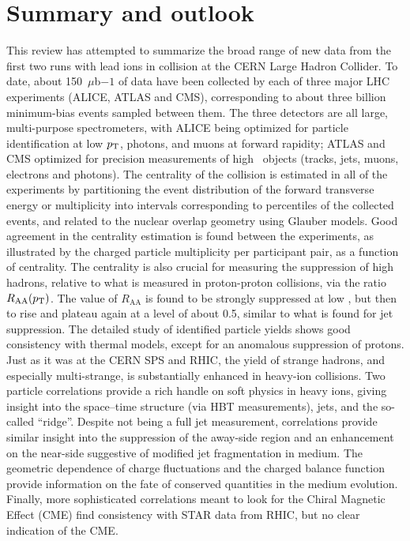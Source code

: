 \section{Summary and outlook}
\label{secall:summary}
This review has attempted to summarize the broad range of new data from the first two
runs with lead ions in collision at the CERN Large Hadron Collider.
To date, about 150~$\mu$b$-1$ of data have been collected by each of
three major LHC experiments (ALICE, ATLAS and CMS), corresponding to about three billion
minimum-bias events sampled between them.
The three detectors are all large, multi-purpose spectrometers, with ALICE being optimized
for particle identification at low $p_{\rm T}$, photons, and muons at forward rapidity;
ATLAS and CMS optimized for precision measurements
of high \pT\ objects (tracks, jets, muons, electrons and photons).
The centrality of the collision is estimated in all of the experiments by partitioning
the event distribution of the forward transverse energy or multiplicity into
intervals corresponding to percentiles of the collected events, and related to
the nuclear overlap geometry using Glauber models.
Good agreement in the centrality estimation is found between the experiments, as illustrated
by the charged particle multiplicity per participant pair, as a function of centrality.
The centrality is also crucial for measuring the suppression of high \pT hadrons, relative
to what is measured in proton-proton collisions, via the ratio $R_{\mathrm{AA}}( \mbox{$p_{\mathrm{T}}$} )$.
The value of $R_{\mathrm{AA}}$ is found to be strongly suppressed at low \pT, but then to rise
and plateau again at a level of about 0.5, similar to what is found for jet suppression.
The detailed study of identified particle yields shows good consistency with thermal models,
except for an anomalous suppression of protons.
Just as it was at the CERN SPS and RHIC, the yield of strange hadrons, and especially multi-strange, is substantially
enhanced in heavy-ion collisions.
Two particle correlations provide a rich handle on soft physics in heavy ions, giving
insight into the space--time structure (via HBT measurements), jets, and the so-called
``ridge''.  Despite not being a full jet measurement, correlations provide similar insight
into the suppression of the away-side region and an enhancement on the near-side
suggestive of modified jet fragmentation in medium.
The geometric dependence of charge fluctuations and the charged balance function provide
information on the fate of conserved quantities in the medium evolution.
Finally, more sophisticated correlations meant to look for the Chiral Magnetic Effect (CME)
find consistency with STAR data from RHIC, but no clear indication of the CME.

